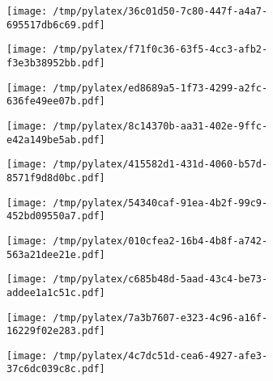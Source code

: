 \documentclass{article}
\begin{document}
\begin{figure}[htbp]
\begin{subfigure}[b]{.3\linewidth}
\texttt{[image: /tmp/pylatex/36c01d50-7c80-447f-a4a7-695517db6c69.pdf]}
\end{subfigure}
\begin{subfigure}[b]{.3\linewidth}
\texttt{[image: /tmp/pylatex/f71f0c36-63f5-4cc3-afb2-f3e3b38952bb.pdf]}
\end{subfigure}
\begin{subfigure}[b]{.3\linewidth}
\texttt{[image: /tmp/pylatex/ed8689a5-1f73-4299-a2fc-636fe49ee07b.pdf]}
\end{subfigure}
\begin{subfigure}[b]{.3\linewidth}
\texttt{[image: /tmp/pylatex/8c14370b-aa31-402e-9ffc-e42a149be5ab.pdf]}
\end{subfigure}
\begin{subfigure}[b]{.3\linewidth}
\texttt{[image: /tmp/pylatex/415582d1-431d-4060-b57d-8571f9d8d0bc.pdf]}
\end{subfigure}
\begin{subfigure}[b]{.3\linewidth}
\texttt{[image: /tmp/pylatex/54340caf-91ea-4b2f-99c9-452bd09550a7.pdf]}
\end{subfigure}
\begin{subfigure}[b]{.3\linewidth}
\texttt{[image: /tmp/pylatex/010cfea2-16b4-4b8f-a742-563a21dee21e.pdf]}
\end{subfigure}
\begin{subfigure}[b]{.3\linewidth}
\texttt{[image: /tmp/pylatex/c685b48d-5aad-43c4-be73-addee1a1c51c.pdf]}
\end{subfigure}
\begin{subfigure}[b]{.3\linewidth}
\texttt{[image: /tmp/pylatex/7a3b7607-e323-4c96-a16f-16229f02e283.pdf]}
\end{subfigure}
\begin{subfigure}[b]{.3\linewidth}
\texttt{[image: /tmp/pylatex/4c7dc51d-cea6-4927-afe3-37c6dc039c8c.pdf]}
\end{subfigure}
\end{figure}
\end{document}
